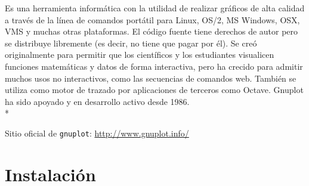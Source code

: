 \documentclass[11.5pt,a4paper]{article}
\begin{document}
Es una herramienta informática con la utilidad de realizar gráficos de alta calidad a través de la línea de comandos portátil para Linux, OS/2, MS Windows, OSX, VMS y muchas otras plataformas. El código fuente tiene derechos de autor pero se distribuye libremente (es decir, no tiene que pagar por él). Se creó originalmente para permitir que los científicos y los estudiantes visualicen funciones matemáticas y datos de forma interactiva, pero ha crecido para admitir muchos usos no interactivos, como las secuencias de comandos web. También se utiliza como motor de trazado por aplicaciones de terceros como Octave. Gnuplot ha sido apoyado y en desarrollo activo desde 1986.\\* 

Sitio oficial de \texttt{gnuplot}: \url{http://www.gnuplot.info/} 


\section{Instalación}
\end{document}
